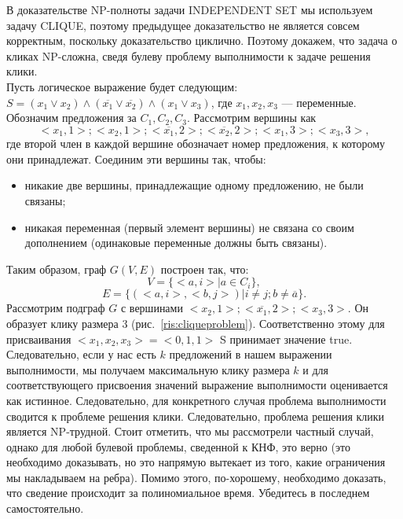     \begin{Rem}
        В доказательстве NP-полноты задачи INDEPENDENT SET мы используем задачу CLIQUE, поэтому предыдущее доказательство не является совсем корректным, поскольку доказательство циклично. Поэтому докажем, что задача о кликах NP-сложна, сведя булеву проблему выполнимости к задаче решения клики.\\
        Пусть логическое выражение будет следующим: $S = (x_1 \vee x_2 ) \wedge (\overline{x_1} \vee \overline{x_2}) \wedge (x_1 \vee x_3 )$, где $x_1 , x_2 , x_3$ --- переменные. Обозначим предложения за $C_1, C_2, C_3$. Рассмотрим вершины как $$<x_1, 1>; <x_2, 1>; <\overline{x_1}, 2>; <\overline{x_2}, 2>; <x_1, 3>; <x_3, 3>,$$ где второй член в каждой вершине обозначает номер предложения, к которому они принадлежат. Соединим эти вершины так, чтобы:
        \begin{itemize}
            \item никакие две вершины, принадлежащие одному предложению, не были связаны;
            \item никакая переменная (первый элемент вершины) не связана со своим дополнением (одинаковые переменные должны быть связаны).
        \end{itemize}
        Таким образом, граф $G(V, E)$ построен так, что: $$V = \{<a, i> | a \in C_i\},$$ 
        $$E = \{(<a, i>, <b, j>) | i \neq j; b \neq \overline{a}\}.$$ 
        Рассмотрим подграф $G$ с вершинами $<x_2, 1>; <\overline{x_1}, 2>; <x_3, 3>$. Он образует клику размера 3 (рис.~\ref{ris:cliqueproblem}). Соответственно этому для присваивания  $<x_1 , x_2, x_3 > = <0, 1, 1>$ S принимает значение true. Следовательно, если у нас есть $k$ предложений в нашем выражении выполнимости, мы получаем максимальную клику размера $k$ и для соответствующего присвоения значений выражение выполнимости оценивается как истинное. Следовательно, для конкретного случая проблема выполнимости сводится к проблеме решения клики. Следовательно, проблема решения клики является NP-трудной. Стоит отметить, что мы рассмотрели частный случай, однако для любой булевой проблемы, сведенной к КНФ, это верно (это необходимо доказывать, но это напрямую вытекает из того, какие ограничения мы накладываем на ребра). Помимо этого, по-хорошему, необходимо доказать, что сведение происходит за полиномиальное время. Убедитесь в последнем самостоятельно.
    \end{Rem}
